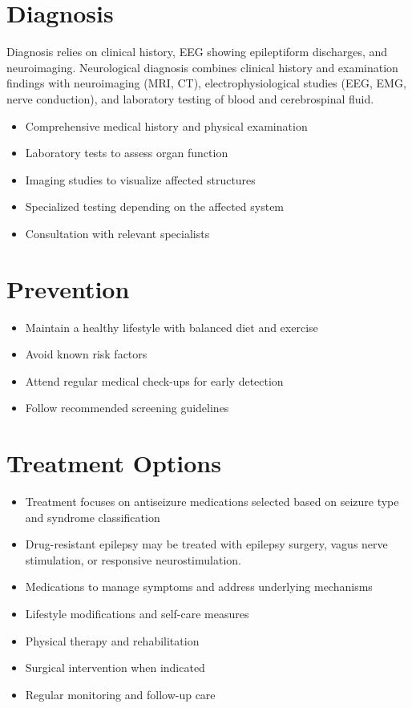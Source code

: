 \section{Diagnosis}
Diagnosis relies on clinical history, EEG showing epileptiform discharges, and neuroimaging. Neurological diagnosis combines clinical history and examination findings with neuroimaging (MRI, CT), electrophysiological studies (EEG, EMG, nerve conduction), and laboratory testing of blood and cerebrospinal fluid.

\begin{itemize}[noitemsep]
  \item Comprehensive medical history and physical examination
  \item Laboratory tests to assess organ function
  \item Imaging studies to visualize affected structures
  \item Specialized testing depending on the affected system
  \item Consultation with relevant specialists
\end{itemize}
\section{Prevention}
\begin{itemize}[noitemsep]
  \item Maintain a healthy lifestyle with balanced diet and exercise
  \item Avoid known risk factors
  \item Attend regular medical check-ups for early detection
  \item Follow recommended screening guidelines
\end{itemize}
\section{Treatment Options}
\begin{itemize}[noitemsep]
  \item Treatment focuses on antiseizure medications selected based on seizure type and syndrome classification
  \item Drug-resistant epilepsy may be treated with epilepsy surgery, vagus nerve stimulation, or responsive neurostimulation.
  \item Medications to manage symptoms and address underlying mechanisms
  \item Lifestyle modifications and self-care measures
  \item Physical therapy and rehabilitation
  \item Surgical intervention when indicated
  \item Regular monitoring and follow-up care
\end{itemize}
